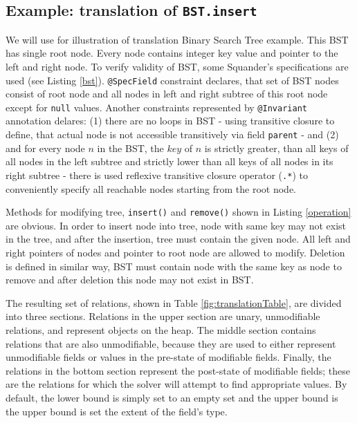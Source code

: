 \documentclass[11pt,twoside,a4paper]{book}
\begin{document}
\subsection{Example: translation of \texttt{BST.insert}}
\label{sub:translation}
We will use for illustration of translation Binary Search Tree example. This BST
has single root node. Every node contains integer key value and pointer to the
left and right node. To verify validity of BST, some Squander's specifications
are used (see Listing \ref{bst}). \verb|@SpecField| constraint declares, that
set of BST nodes consist of root node and all nodes in left and right subtree of this root node except
for \verb|null| values. Another constraints represented by \verb|@Invariant|
annotation delares: (1) there are no loops in BST - using transitive closure to
define, that actual node is not accessible transitively via field \verb|parent|
- and (2) and for every node $n$ in the BST, the $key$ of $n$ is strictly greater,
than all keys of all nodes in the left subtree and strictly lower than all keys
of all nodes in its right subtree - there is used reflexive transitive closure
operator (\verb|.*|) to conveniently specify all reachable nodes starting from
the root node.




Methods for modifying tree, \verb|insert()| and \verb|remove()| shown in
Listing \ref{operation} are obvious. In order to insert node into tree, node
with same key may not exist in the tree, and after the insertion, tree must
contain the given node. All left and right pointers of nodes and pointer to root
node are allowed to modify. Deletion is defined in similar way, BST must contain node
with the same key as node to remove and after deletion this node may not exist
in BST.
\newpage


The resulting set of relations, shown in Table \ref{fig:translationTable}, are
divided into three sections. Relations in the upper section are unary, unmodifiable relations,
and represent objects on the heap. The middle section contains relations that
are also unmodifiable, because they are used to either represent unmodifiable
fields or values in the pre-state of modifiable fields. Finally, the relations
in the bottom section represent the post-state of modifiable fields; these are
the relations for which the solver will attempt to find appropriate values. By
default, the lower bound is simply set to an empty set and the upper bound is
the upper bound is set the extent of the field's type.
\end{document}
